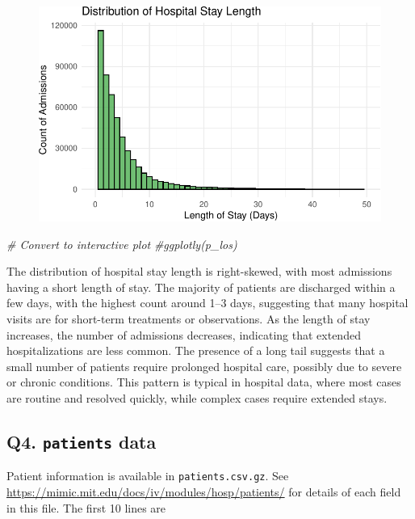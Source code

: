 \documentclass[
]{article}
\newenvironment{Shaded}{\begin{snugshade}}{\end{snugshade}}
\newcommand{\CommentTok}[1]{\textcolor[rgb]{0.56,0.35,0.01}{\textit{#1}}}
\begin{document}
\begin{figure}[H]

{\centering \includegraphics{hw3_files/figure-pdf/unnamed-chunk-26-1.pdf}

}

\end{figure}

\begin{Shaded}
\begin{Highlighting}[]
\CommentTok{\# Convert to interactive plot}
\CommentTok{\#ggplotly(p\_los)}
\end{Highlighting}
\end{Shaded}

The distribution of hospital stay length is right-skewed, with most
admissions having a short length of stay. The majority of patients are
discharged within a few days, with the highest count around 1--3 days,
suggesting that many hospital visits are for short-term treatments or
observations. As the length of stay increases, the number of admissions
decreases, indicating that extended hospitalizations are less common.
The presence of a long tail suggests that a small number of patients
require prolonged hospital care, possibly due to severe or chronic
conditions. This pattern is typical in hospital data, where most cases
are routine and resolved quickly, while complex cases require extended
stays.

\hypertarget{q4.-patients-data}{%
\subsection{\texorpdfstring{Q4. \texttt{patients}
data}{Q4. patients data}}\label{q4.-patients-data}}

Patient information is available in \texttt{patients.csv.gz}. See
\url{https://mimic.mit.edu/docs/iv/modules/hosp/patients/} for details
of each field in this file. The first 10 lines are
\end{document}
